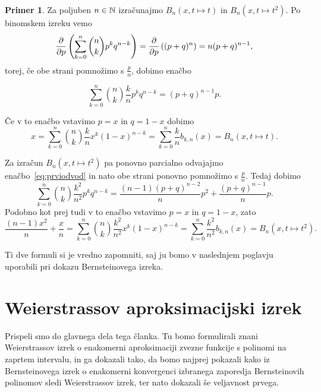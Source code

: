 \documentclass[a4paper, reqno]{amsart}
\theoremstyle{theorem}
\theoremstyle{definition}
\newtheorem{primer}[definicija]{Primer}
\begin{document}
\begin{primer}
	\label{B polinom primer}
	Za poljuben $n \in \mathbb{N}$ izračunajmo $B_n(x, t \mapsto t)$ in $B_n(x, t \mapsto t^2)$. 
	Po binomskem izreku vemo
$$
\pdv{p}\left( \sum_{k=0}^n \binom nk p^k q^{n-k}\right) = \pdv{p}\left((p + q)^n\right) =
n (p + q)^{n - 1}\text{,}
$$
torej, če obe strani pomnožimo s $\frac pn$, dobimo enačbo

\begin{equation}
	\sum_{k=0}^n \binom nk \frac kn p^k q^{n-k} = (p + q)^{n - 1}p\text{.}
	\label{eq:prviodvod}
\end{equation}

Če v to enačbo vstavimo $p = x$ in $q = 1 - x$ dobimo
$$
x = \sum_{k=0}^n \binom nk \frac kn x^k (1 - x)^{n-k} = 
\sum_{k = 0}^n \frac kn b_{k,n}(x) =
B_n(x, t \mapsto t)\text{.}
$$

Za izračun $B_n(x, t \mapsto t^2)$ pa ponovno parcialno odvajajmo 
enačbo~\eqref{eq:prviodvod} in nato obe strani ponovno pomnožimo s $\frac pn$. 
Tedaj dobimo
$$
\sum_{k=0}^n \binom nk \frac {k^2}{n^2} p^k q^{n-k} = 
\frac {(n - 1)(p + q)^{n - 2}}{n}p^2 + \frac{(p + q)^{n - 1}}{n}p\text{.}
$$
Podobno kot prej tudi v to enačbo vstavimo $p = x$ in $q = 1 - x$, zato
$$
\frac{(n - 1)x^2}{n} + \frac xn = 
\sum_{k=0}^n \binom nk \frac {k^2}{n^2} x^k (1 - x)^{n-k} = 
\sum_{k = 0}^n \frac{k^2}{n^2} b_{k,n}(x) =
B_n(x, t \mapsto t^2)\text{.}
$$

Ti dve formuli si je vredno zapomniti, saj ju bomo v naslednjem poglavju uporabili
pri dokazu Bernsteinovega izreka.
\end{primer}


\section{Weierstrassov aproksimacijski izrek}

\par
Prispeli smo do glavnega dela tega članka. Tu bomo formulirali znani Weierstrassov
izrek o enakomerni aproksimaciji zvezne funkcije s polinomi na zaprtem intervalu,
in ga dokazali tako, da bomo najprej pokazali kako iz Bernsteinovega izrek o 
enakomerni konvergenci izbranega zaporedja Bernsteinovih polinomov sledi 
Weierstrassov izrek, ter nato dokazali še veljavnost prvega. 
\end{document}
